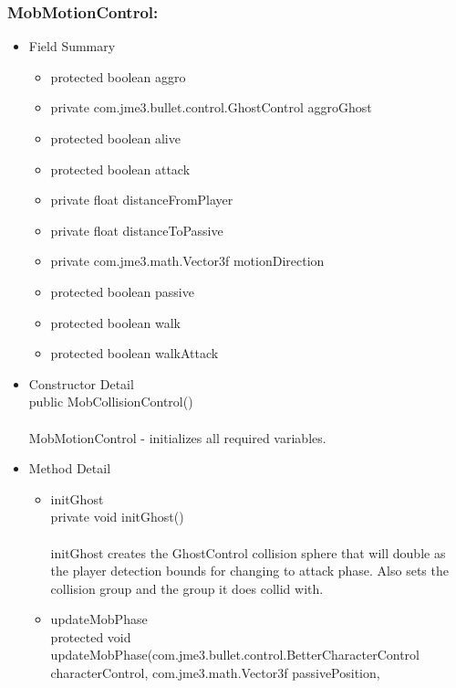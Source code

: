 \documentclass[letterpaper]{article}
\begin{document}
						\subsubsection*{MobMotionControl:}
						\vspace{0.1in}	
							\begin{itemize}
								\item	Field Summary
										\begin{itemize}
											\item	protected boolean	aggro 
											\item	private com.jme3.bullet.control.GhostControl	aggroGhost 
											\item	protected boolean	alive 
											\item	protected boolean	attack 
											\item	private float	distanceFromPlayer 
											\item	private float	distanceToPassive 
											\item	private com.jme3.math.Vector3f	motionDirection 
											\item	protected boolean	passive 
											\item	protected boolean	walk 
											\item	protected boolean	walkAttack  
										\end{itemize}
								\item	Constructor Detail \\
										public MobCollisionControl() \\ \\ 
										MobMotionControl - initializes all required variables. \\
								\item	Method Detail
										\begin{itemize}
											\item	initGhost \\
													private void initGhost() \\ \\
													initGhost creates the GhostControl collision sphere that will double as the player detection bounds for changing to attack phase. Also sets the collision group and the group it does collid with.
											\item	updateMobPhase \\
													protected void updateMobPhase(com.jme3.bullet.control.BetterCharacterControl \\ characterControl, com.jme3.math.Vector3f passivePosition, \\

\end{itemize}
\end{itemize}
\end{document}
